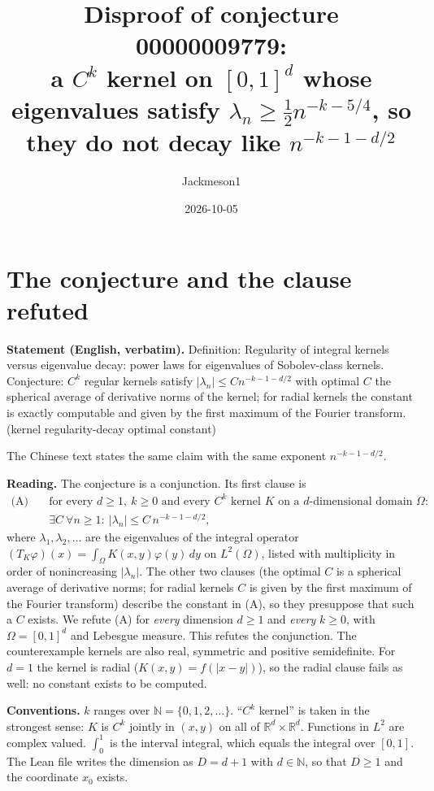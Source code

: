 \documentclass[11pt]{article}
\title{Disproof of conjecture 00000009779:\\ a $C^k$ kernel on $[0,1]^d$ whose eigenvalues satisfy
$\lambda_n\ge\tfrac12 n^{-k-5/4}$, so they do not decay like $n^{-k-1-d/2}$}
\author{Jackmeson1}
\date{2026-10-05}
\theoremstyle{definition}
\theoremstyle{remark}
\begin{document}
\maketitle

\section{The conjecture and the clause refuted}

\textbf{Statement (English, verbatim).} Definition: Regularity of integral kernels versus eigenvalue
decay: power laws for eigenvalues of Sobolev-class kernels. Conjecture: $C^k$ regular kernels satisfy
$|\lambda_n|\le C n^{-k-1-d/2}$ with optimal $C$ the spherical average of derivative norms of the
kernel; for radial kernels the constant is exactly computable and given by the first maximum of the
Fourier transform. (kernel regularity-decay optimal constant)

The Chinese text states the same claim with the same exponent $n^{-k-1-d/2}$.

\textbf{Reading.} The conjecture is a conjunction. Its first clause is
\begin{align*}
  \text{(A)}\quad &\text{for every } d\ge 1,\ k\ge 0 \text{ and every } C^k \text{ kernel } K
  \text{ on a } d\text{-dimensional domain } \Omega:\\
  &\exists C\ \forall n\ge 1:\ |\lambda_n|\le C\,n^{-k-1-d/2},
\end{align*}
where $\lambda_1,\lambda_2,\dots$ are the eigenvalues of the integral operator
$(T_K\varphi)(x)=\int_\Omega K(x,y)\varphi(y)\,dy$ on $L^2(\Omega)$, listed with multiplicity in
order of nonincreasing $|\lambda_n|$. The other two clauses (the optimal $C$ is a spherical average
of derivative norms; for radial kernels $C$ is given by the first maximum of the Fourier transform)
describe the constant in (A), so they presuppose that such a $C$ exists. We refute (A) for
\emph{every} dimension $d\ge 1$ and \emph{every} $k\ge 0$, with $\Omega=[0,1]^d$ and Lebesgue
measure. This refutes the conjunction. The counterexample kernels are also real, symmetric and
positive semidefinite. For $d=1$ the kernel is radial ($K(x,y)=f(|x-y|)$), so the radial clause
fails as well: no constant exists to be computed.

\textbf{Conventions.} $k$ ranges over $\mathbb N=\{0,1,2,\dots\}$. ``$C^k$ kernel'' is taken in the
strongest sense: $K$ is $C^k$ jointly in $(x,y)$ on all of $\mathbb R^d\times\mathbb R^d$. Functions
in $L^2$ are complex valued. $\int_0^1$ is the interval integral, which equals the integral over
$[0,1]$. The Lean file writes the dimension as $D=d+1$ with $d\in\mathbb N$, so that $D\ge 1$ and
the coordinate $x_0$ exists.
\end{document}
